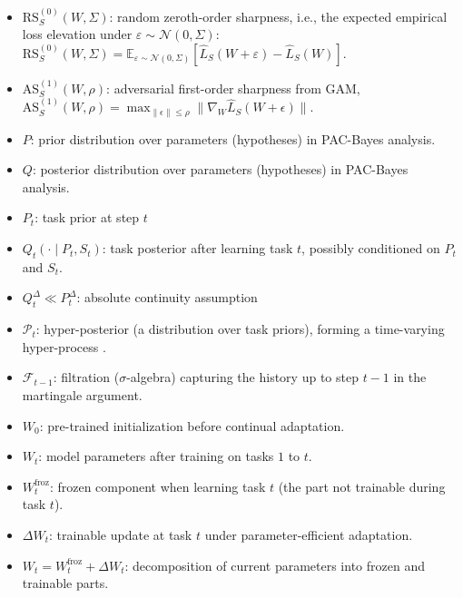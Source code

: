 \documentclass{article}
\theoremstyle{plain}
\theoremstyle{definition}
\theoremstyle{remark}
\begin{document}
\begin{itemize}
\item $\mathrm{RS}_S^{(0)}(W,\Sigma)$: random zeroth-order sharpness, i.e., the expected empirical loss elevation under $\varepsilon\sim\mathcal N(0,\Sigma)$:
$\mathrm{RS}_S^{(0)}(W,\Sigma)=\mathbb E_{\varepsilon\sim\mathcal N(0,\Sigma)}[\hat L_S(W+\varepsilon)-\hat L_S(W)]$.
\item $\mathrm{AS}^{(1)}_S(W,\rho)$: adversarial first-order sharpness  from GAM,
$\mathrm{AS}^{(1)}_S(W,\rho)=\max_{\|\epsilon\|\le\rho}\|\nabla_W\widehat L_S(W+\epsilon)\|$.

\item $P$: prior distribution over parameters (hypotheses) in PAC-Bayes analysis.
\item $Q$: posterior distribution over parameters (hypotheses) in PAC-Bayes analysis.

\item $P_t$: task prior at step $t$ 
\item $Q_t(\cdot \mid P_t,S_t)$: task posterior after learning task $t$, possibly conditioned on $P_t$ and $S_t$.
\item $Q_t^\Delta \ll P_t^\Delta$: absolute continuity assumption
\item $\mathcal P_t$: hyper-posterior (a distribution over task priors), forming a time-varying hyper-process . 
\item $\mathcal F_{t-1}$: filtration ($\sigma$-algebra) capturing the history up to step $t-1$ in the martingale argument.

\item $W_0$: pre-trained initialization before continual adaptation.
\item $W_t$: model parameters after training on tasks $1$ to $t$.
\item $W_t^{\mathrm{froz}}$: frozen component when learning task $t$ (the part not trainable during task $t$).
\item $\Delta W_t$: trainable update at task $t$ under parameter-efficient adaptation.
\item $W_t = W_t^{\mathrm{froz}} + \Delta W_t$: decomposition of current parameters into frozen and trainable parts. 






\end{itemize}
\end{document}
